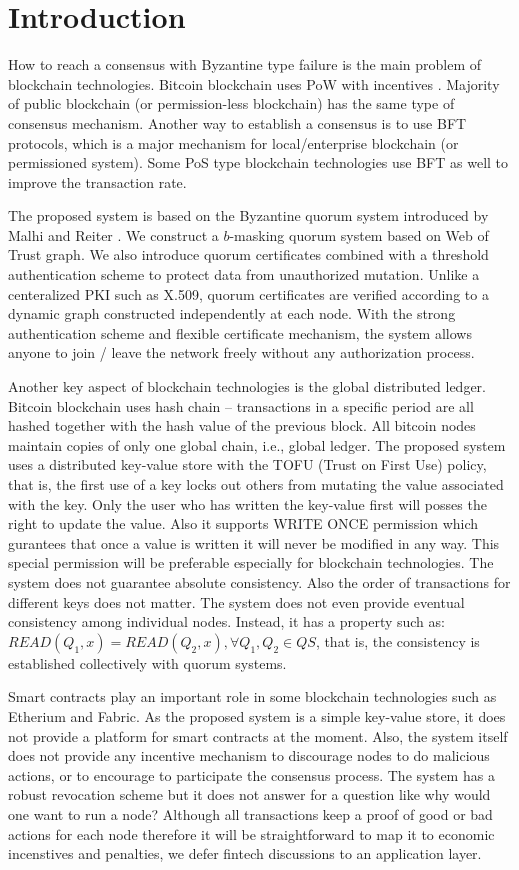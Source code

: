 \section{Introduction}
How to reach a consensus with Byzantine type failure is the main
problem of blockchain technologies. Bitcoin blockchain uses PoW with
incentives \cite{bitcoin}. Majority of public blockchain (or permission-less
blockchain) has the same type of consensus mechanism. Another way to
establish a consensus is to use BFT protocols, which is a major
mechanism for local/enterprise blockchain (or permissioned
system). Some PoS type blockchain technologies use BFT as well to
improve the transaction rate.

The proposed system is based on the Byzantine quorum system introduced
by Malhi and Reiter \cite{Delhi:1}. We construct a $b$-masking quorum
system based on Web of Trust graph. We also introduce quorum certificates
combined with a threshold authentication scheme to protect data from
unauthorized mutation. Unlike a centeralized PKI such as X.509, quorum
certificates are verified according to a dynamic graph constructed
independently at each node. With the strong authentication scheme and
flexible certificate mechanism, the system allows anyone to join /
leave the network freely without any authorization process.

Another key aspect of blockchain technologies is the global
distributed ledger. Bitcoin blockchain uses hash chain -- transactions
in a specific period are all hashed together with the hash value of
the previous block. All bitcoin nodes maintain copies of only one
global chain, i.e., global ledger.
The proposed system uses a distributed key-value store with the TOFU
(Trust on First Use) policy, that is, the first use of a key locks out
others from mutating the value associated with the key. Only the
user who has written the key-value first will posses the right to
update the value. Also it supports WRITE ONCE permission which
gurantees that once a value is written it will never be modified in
any way. This special permission will be preferable especially for
blockchain technologies.
The system does not guarantee absolute consistency. Also the order of
transactions for different keys does not matter. The system does not
even provide eventual consistency among individual nodes. Instead, it
has a property such as: $READ(Q_1, x) = READ(Q_2, x), \forall Q_1, Q_2
\in QS$, that is, the consistency is established collectively with
quorum systems.

Smart contracts play an important role in some blockchain technologies
such as Etherium and Fabric. As the proposed system is a simple
key-value store, it does not provide a platform for smart contracts at
the moment. Also, the system itself does not provide any incentive
mechanism to discourage nodes to do malicious actions, or to encourage
to participate the consensus process. The system has a robust
revocation scheme but it does not answer for a question like why would
one want to run a node? Although all transactions keep a proof of good
or bad actions for each node therefore it will be straightforward to
map it to economic incenstives and penalties, we defer fintech
discussions to an application layer.
